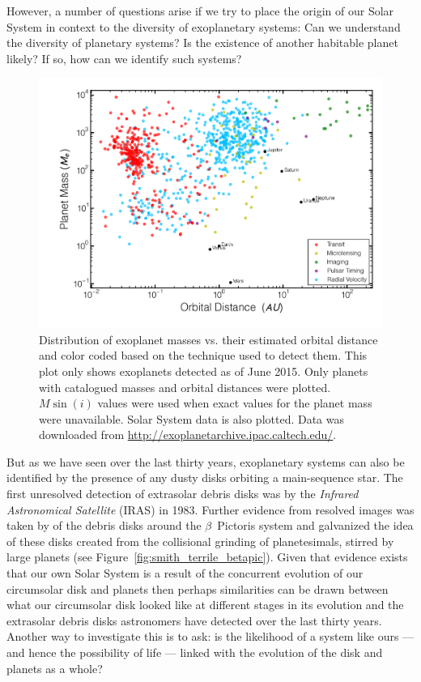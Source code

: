     However, a number of questions arise if we try to place the origin of our Solar System in context to the diversity of exoplanetary systems: Can we understand the diversity of planetary systems? Is the existence of another habitable planet likely? If so, how can we identify such systems?
    \begin{figure}
    \centering
    \includegraphics[width=\textwidth]{Ch1/exoplanet_detections_june2015} 
    \caption[Exoplanet Statistics]{Distribution of exoplanet masses vs. their estimated orbital distance and color coded based on the technique used to detect them. This plot only shows exoplanets detected as of June 2015.  Only planets with catalogued masses and orbital distances were plotted. $M \sin(i)$ values were used when exact values for the planet mass were unavailable. Solar System data is also plotted. Data was downloaded from \url{http://exoplanetarchive.ipac.caltech.edu/}.}
    \label{fig:known_exoplanets}
    \end{figure}
    
    But as we have seen over the last thirty years, exoplanetary systems can also be identified by the presence of any dusty disks orbiting a main-sequence star. The first unresolved detection of extrasolar debris disks was by the \textit{Infrared Astronomical Satellite} (IRAS) in 1983. Further evidence from resolved images was taken by \citet{Smith1984} of the debris disks around the $\beta$~Pictoris system and galvanized the idea of these disks created from the collisional grinding of planetesimals, stirred by large planets  (see Figure~\ref{fig:smith_terrile_betapic}). Given that evidence exists that our own Solar System is a result of the concurrent evolution of our circumsolar disk and planets then perhaps similarities can be drawn between what our circumsolar disk looked like at different stages in its evolution and the extrasolar debris disks astronomers have detected over the last thirty years. Another way to investigate this is to ask: is the likelihood of a system like ours --- and hence the possibility of life --- linked with the evolution of the disk and planets as a whole?
    
